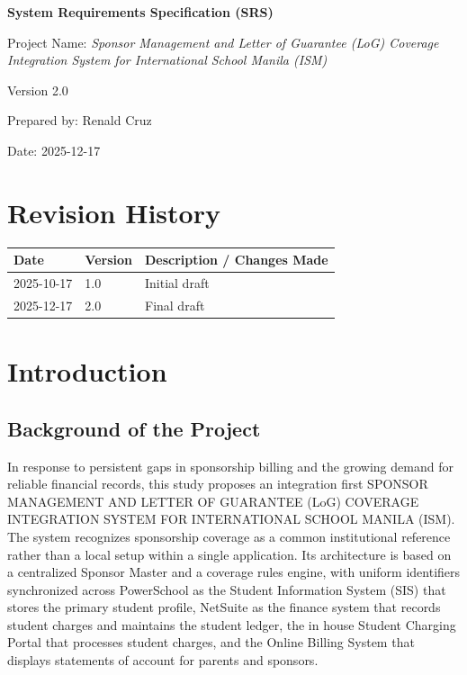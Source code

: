 \documentclass[12pt,a4paper]{article}
\begin{document}
\begin{titlepage}
    \centering
    \vspace*{4cm}
    {\LARGE \textbf{System Requirements Specification (SRS)} \par}
    \vspace{1cm}
    {\Large Project Name: \textit{Sponsor Management and Letter of Guarantee (LoG) Coverage Integration System for International School Manila (ISM)} \par}
    \vspace{2cm}
    Version 2.0 \par
    \vspace{0.5cm}
    Prepared by: Renald Cruz \par
    Date: 2025-12-17 \par
    \vfill
\end{titlepage}

\section*{Revision History}

\begin{longtable}{|p{3cm}|p{3cm}|p{7cm}|}
\hline
\textbf{Date} & \textbf{Version} & \textbf{Description / Changes Made} \\
\hline
2025-10-17& 1.0 & Initial draft \\
\hline
2025-12-17& 2.0 & Final draft \\
\hline
\end{longtable}

\tableofcontents
\newpage

\section{Introduction}

\subsection{Background of the Project}

In response to persistent gaps in sponsorship billing and the growing demand for reliable financial records, this study proposes an integration first SPONSOR MANAGEMENT AND LETTER OF GUARANTEE (LoG) COVERAGE INTEGRATION SYSTEM FOR INTERNATIONAL SCHOOL MANILA (ISM). The system recognizes sponsorship coverage as a common institutional reference rather than a local setup within a single application. Its architecture is based on a centralized Sponsor Master and a coverage rules engine, with uniform identifiers synchronized across PowerSchool as the Student Information System (SIS) that stores the primary student profile, NetSuite as the finance system that records student charges and maintains the student ledger, the in house Student Charging Portal that processes student charges, and the Online Billing System that displays statements of account for parents and sponsors.
\end{document}
